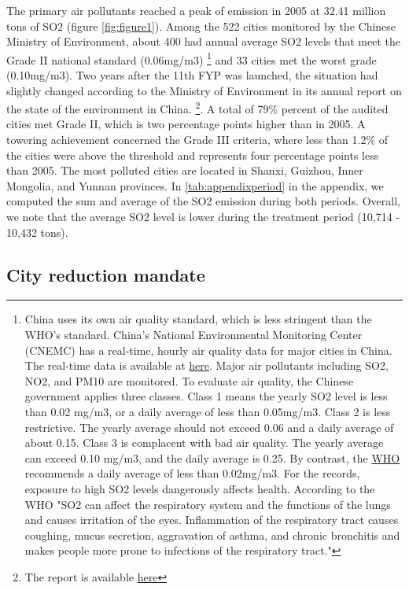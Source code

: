 \documentclass[12pt]{article}
\begin{document}
The primary air pollutants reached a peak of emission in 2005 at 32.41 million tons of SO2 (figure \ref{fig:figure1}). Among the 522 cities monitored by the Chinese Ministry of Environment, about 400 had annual average SO2 levels that meet the Grade II national standard (0.06mg/m3) \footnote{China uses its own air quality standard, which is less stringent than the WHO’s standard. China's National Environmental Monitoring Center (CNEMC) has a real-time, hourly air quality data for major cities in China. The real-time data is available at \href{http://www.cnemc.cn/}{here}. Major air pollutants including SO2, NO2, and PM10 are monitored. To evaluate air quality, the Chinese government applies three classes. Class 1 means the yearly SO2 level is less than 0.02 mg/m3, or a daily average of less than 0.05mg/m3. Class 2 is less restrictive. The yearly average should not exceed 0.06 and a daily average of about 0.15. Class 3 is complacent with bad air quality. The yearly average can exceed 0.10 mg/m3, and the daily average is 0.25. By contrast, the \href{https://www.who.int/news-room/fact-sheets/detail/ambient-(outdoor)-air-quality-and-health}{WHO} recommends a daily average of less than 0.02mg/m3. For the records, exposure to high SO2 levels dangerously affects health. According to the WHO "SO2 can affect the respiratory system and the functions of the lungs and causes irritation of the eyes. Inflammation of the respiratory tract causes coughing, mucus secretion, aggravation of asthma, and chronic bronchitis and makes people more prone to infections of the respiratory tract."} and 33 cities met the worst grade (0.10mg/m3). Two years after the 11th FYP was launched, the situation had slightly changed according to the Ministry of Environment in its annual report on the state of the environment in China. \footnote{The report is available \href{http://english.mee.gov.cn/Resources/Reports/soe/soe2007/201}{here}}. A total of 79\% percent of the audited cities met Grade II, which is two percentage points higher than in 2005. A towering achievement concerned the Grade III criteria, where less than 1.2\% of the cities were above the threshold and represents four percentage points less than 2005. The most polluted cities are located in Shanxi, Guizhou, Inner Mongolia, and Yunnan provinces. In \ref{tab:appendixperiod} in the appendix, we computed the sum and average of the SO2 emission during both periods. Overall, we note that the average SO2 level is lower during the treatment period (10,714 - 10,432 tons).


\subsection{City reduction mandate} \label{sec:mandate}
\end{document}

